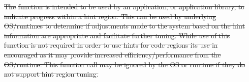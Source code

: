 \documentclass[12pt]{report} %
\providecommand{\DIFdeltex}[1]{{\protect\color{red}\sout{#1}}}                      %
\providecommand{\DIFdelbegin}{} %
\providecommand{\DIFdelend}{} %
\providecommand{\DIFdel}[1]{\texorpdfstring{\DIFdeltex{#1}}{}} %
\newcommand{\DIFscaledelfig}{0.5}
\newlength{\DIFdelgraphicswidth} %
\newlength{\DIFdelgraphicsheight} %
\newcommand{\DIFdelincludegraphics}[2][]{%
\sbox{\DIFdelgraphicsbox}{\DIFOincludegraphics[#1]{#2}}%
\settoboxwidth{\DIFdelgraphicswidth}{\DIFdelgraphicsbox} %
\settoboxtotalheight{\DIFdelgraphicsheight}{\DIFdelgraphicsbox} %
\scalebox{\DIFscaledelfig}{%
\parbox[b]{\DIFdelgraphicswidth}{\usebox{\DIFdelgraphicsbox}\\[-\baselineskip] \rule{\DIFdelgraphicswidth}{0em}}\llap{\resizebox{\DIFdelgraphicswidth}{\DIFdelgraphicsheight}{%
\setlength{\unitlength}{\DIFdelgraphicswidth}%
\begin{picture}(1,1)%
\thicklines\linethickness{2pt} %
{\color[rgb]{1,0,0}\put(0,0){\framebox(1,1){}}}%
{\color[rgb]{1,0,0}\put(0,0){\line( 1,1){1}}}%
{\color[rgb]{1,0,0}\put(0,1){\line(1,-1){1}}}%
\end{picture}%
}\hspace*{3pt}}} %
} %
\DeclareRobustCommand{\DIFdelbegin}{\DIFOdelbegin \let\includegraphics\DIFdelincludegraphics} %
\DeclareRobustCommand{\DIFdelend}{\DIFOaddend \let\includegraphics\DIFOincludegraphics} %
\begin{document}
\DIFdelend %
\DIFdelbegin %


\DIFdel{The }%
\DIFdel{function is intended to be used by an application, 
or application library, to indicate progress within a hint region. This can be used by underlying
OS/runtimes to determine if adjustments made to the system based on the hint information are appropriate and
facilitate further tuning. While use of this function is not required in order to use hints for code regions
its use in encouraged as it may provide increased efficiency/performance from the OS/runtime. 
This function call may be ignored by the OS or runtime if they do not support hint region tuning.
}%

\end{document}
